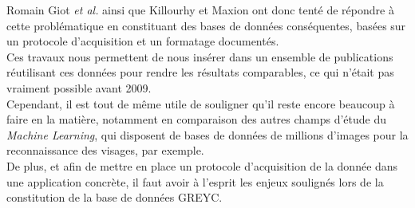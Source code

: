 Romain Giot \textit{et al.} \cite{giotGREYC} ainsi que Killourhy et Maxion \cite{killourhy2009} ont donc tenté de répondre à cette problématique en constituant des bases de données conséquentes, basées sur un protocole d'acquisition et un formatage documentés.\\

Ces travaux nous permettent de nous insérer dans un ensemble de publications réutilisant ces données pour rendre les résultats comparables, ce qui n'était pas vraiment possible avant 2009.\\

Cependant, il est tout de même utile de souligner qu'il reste encore beaucoup à faire en la matière, notamment en comparaison des autres champs d'étude du \textit{Machine Learning}, qui disposent de bases de données de millions d'images pour la reconnaissance des visages, par exemple.\\

De plus, et afin de mettre en place un protocole d'acquisition de la donnée dans une application concrète, il faut avoir à l'esprit les enjeux soulignés lors de la constitution de la base de données GREYC\cite{giotGREYC}.\\
